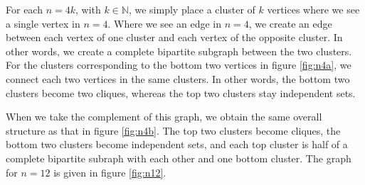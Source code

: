 \documentclass[12pt]{article}
\newcommand{\N}{\mathbb{N}}
\begin{document}
For each $n=4k$, with $k\in\N$, we simply place a cluster of $k$ vertices where we see a single vertex in $n=4$. Where we see an edge in $n=4$, we create an edge between each vertex of one cluster and each vertex of the opposite cluster. In other words, we create a complete bipartite subgraph between the two clusters. For the clusters corresponding to the bottom two vertices in figure \ref{fig:n4a}, we connect each two vertices in the same clusters. In other words, the bottom two clusters become two cliques, whereas the top two clusters stay independent sets.

When we take the complement of this graph, we obtain the same overall structure as that in figure \ref{fig:n4b}. The top two clusters become cliques, the bottom two clusters become independent sets, and each top cluster is half of a complete bipartite subraph with each other and one bottom cluster. The graph for $n=12$ is given in figure \ref{fig:n12}.
\end{document}
